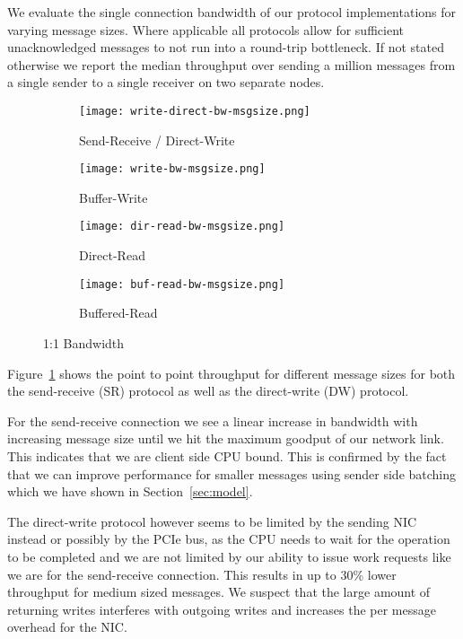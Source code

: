 We evaluate the single connection bandwidth of our protocol implementations for varying message sizes. Where applicable all 
protocols allow for sufficient unacknowledged messages to not run into a round-trip bottleneck. If not 
stated otherwise we report the median throughput over sending a million messages from a single sender to a single receiver
on two separate nodes.

\begin{figure}[htp]
\begin{subfigure}[b]{0.49\textwidth}
  \centering
  \texttt{[image: write-direct-bw-msgsize.png]}
  \caption{Send-Receive / Direct-Write}
  \label{fig:plot-sr-dw-bw}
\end{subfigure}
\begin{subfigure}[b]{0.49\textwidth}
  \centering
  \texttt{[image: write-bw-msgsize.png]}
  \caption{Buffer-Write}
  \label{fig:plot-bw-bw}
\end{subfigure}
\begin{subfigure}[b]{0.49\textwidth}
  \centering
  \texttt{[image: dir-read-bw-msgsize.png]}
  \caption{Direct-Read}
  \label{fig:plot-dr-bw}
\end{subfigure}
\begin{subfigure}[b]{0.49\textwidth}
  \centering
  \texttt{[image: buf-read-bw-msgsize.png]}
  \caption{Buffered-Read}
  \label{fig:plot-br-bw}
\end{subfigure}
  \caption{1:1 Bandwidth}
  \label{fig:plot-br-bw}
\end{figure}

Figure~\ref{fig:plot-sr-dw-bw} shows the point to point throughput for different message sizes for both the send-receive (SR)
protocol as well as the direct-write (DW) protocol. 

For the send-receive connection we see a linear increase in bandwidth with increasing message size until we hit the
maximum goodput of our network link. This indicates that we are client side CPU bound. This is confirmed by the fact that we can
improve performance for smaller messages using sender side batching which we have shown in Section~\ref{sec:model}.

The direct-write protocol however seems to be limited by the sending NIC instead or possibly by the PCIe bus, as the CPU needs
to wait for the operation to be completed and we are not limited by our ability to issue work requests like we are for the 
send-receive connection. This results in up to 30\% lower throughput for medium sized messages. We suspect that the large 
amount of returning writes interferes with outgoing writes and increases the per message overhead for the NIC. 
 

